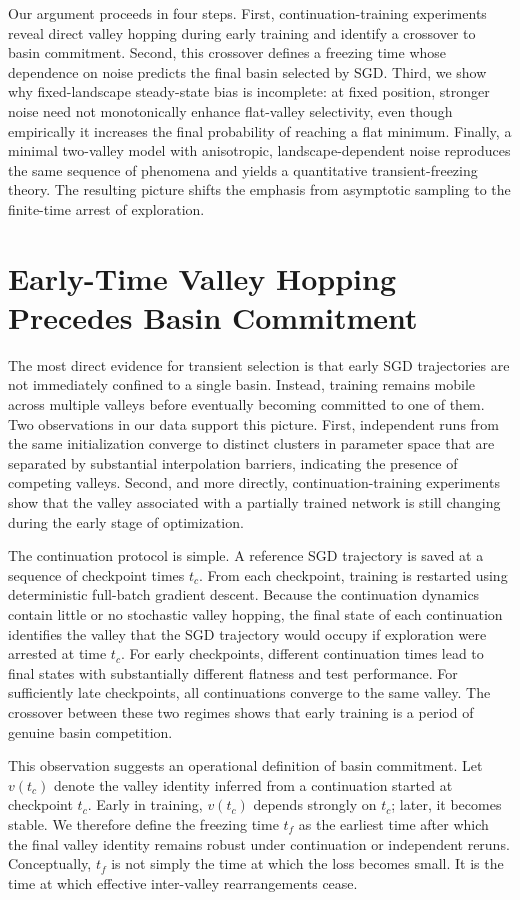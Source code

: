 \documentclass[aps,prx,reprint,superscriptaddress,longbibliography,nofootinbib,floatfix]{revtex4-2}
\begin{document}
Our argument proceeds in four steps. First, continuation-training experiments reveal direct valley hopping during early training and identify a crossover to basin commitment. Second, this crossover defines a freezing time whose dependence on noise predicts the final basin selected by SGD. Third, we show why fixed-landscape steady-state bias is incomplete: at fixed position, stronger noise need not monotonically enhance flat-valley selectivity, even though empirically it increases the final probability of reaching a flat minimum. Finally, a minimal two-valley model with anisotropic, landscape-dependent noise reproduces the same sequence of phenomena and yields a quantitative transient-freezing theory. The resulting picture shifts the emphasis from asymptotic sampling to the finite-time arrest of exploration.

\section{Early-Time Valley Hopping Precedes Basin Commitment}
The most direct evidence for transient selection is that early SGD trajectories are not immediately confined to a single basin. Instead, training remains mobile across multiple valleys before eventually becoming committed to one of them. Two observations in our data support this picture. First, independent runs from the same initialization converge to distinct clusters in parameter space that are separated by substantial interpolation barriers, indicating the presence of competing valleys. Second, and more directly, continuation-training experiments show that the valley associated with a partially trained network is still changing during the early stage of optimization.

The continuation protocol is simple. A reference SGD trajectory is saved at a sequence of checkpoint times $t_c$. From each checkpoint, training is restarted using deterministic full-batch gradient descent. Because the continuation dynamics contain little or no stochastic valley hopping, the final state of each continuation identifies the valley that the SGD trajectory would occupy if exploration were arrested at time $t_c$. For early checkpoints, different continuation times lead to final states with substantially different flatness and test performance. For sufficiently late checkpoints, all continuations converge to the same valley. The crossover between these two regimes shows that early training is a period of genuine basin competition.

This observation suggests an operational definition of basin commitment. Let $v(t_c)$ denote the valley identity inferred from a continuation started at checkpoint $t_c$. Early in training, $v(t_c)$ depends strongly on $t_c$; later, it becomes stable. We therefore define the freezing time $t_f$ as the earliest time after which the final valley identity remains robust under continuation or independent reruns. Conceptually, $t_f$ is not simply the time at which the loss becomes small. It is the time at which effective inter-valley rearrangements cease.
\end{document}
